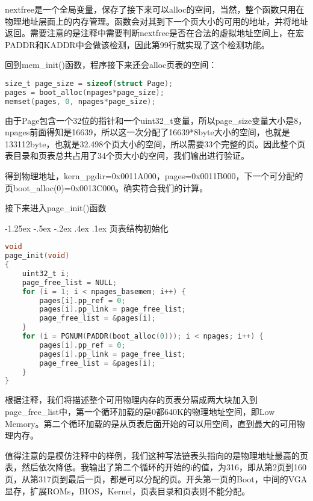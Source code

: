 \documentclass[11pt,a4paper]{article}
\makeatletter
\newcommand{\sihao}{\fontsize{14pt}{\baselineskip}\selectfont}
\renewcommand\subsection{\@startsection{subsection}{1}{\z@}%
{-1.25ex \@plus -.5ex \@minus -.2ex}%
{.4ex \@plus .1ex}%
{\normalfont\sihao\fontspec{黑体}}}
\makeatother
\begin{document}
nextfree是一个全局变量，保存了接下来可以alloc的空间，当然，整个函数只用在物理地址层面上的内存管理。函数会对其到下一个页大小的可用的地址，并将地址返回。需要注意的是注释中需要判断nextfree是否在合法的虚拟地址空间上，在宏PADDR和KADDR中会做该检测，因此第99行就实现了这个检测功能。

回到mem\_init()函数，程序接下来还会alloc页表的空间：
\setmainfont{Consolas}
\begin{lstlisting}[language={C},firstnumber=160,title=kern/pmap.c] 
size_t page_size = sizeof(struct Page);
pages = boot_alloc(npages*page_size);
memset(pages, 0, npages*page_size);
\end{lstlisting}
\setmainfont[BoldFont=黑体]{宋体}

由于Page包含一个32位的指针和一个uint32\_t变量，所以page\_size变量大小是8，npages前面得知是16639，所以这一次分配了16639*8byte大小的空间，也就是133112byte，也就是32.498个页大小的空间，所以需要33个完整的页。因此整个页表目录和页表总共占用了34个页大小的空间，我们输出进行验证。

得到物理地址，kern\_pgdir=0x0011A000，pages=0x0011B000，下一个可分配的页boot\_alloc(0)=0x0013C000。确实符合我们的计算。

接下来进入page\_init()函数

\subsection{页表结构初始化}

\setmainfont{Consolas}
\begin{lstlisting}[language={C},firstnumber=249,title=kern/pmap.c] 
void
page_init(void)
{
	uint32_t i;
	page_free_list = NULL;
	for (i = 1; i < npages_basemem; i++) {
		pages[i].pp_ref = 0;
		pages[i].pp_link = page_free_list;
		page_free_list = &pages[i];
	}
	for (i = PGNUM(PADDR(boot_alloc(0))); i < npages; i++) {
		pages[i].pp_ref = 0;
		pages[i].pp_link = page_free_list;
		page_free_list = &pages[i];
	}
}
\end{lstlisting}
\setmainfont[BoldFont=黑体]{宋体}

根据注释，我们将描述整个可用物理内存的页表分隔成两大块加入到page\_free\_list中，第一个循环加载的是0都640K的物理地址空间，即Low Memory。第二个循环加载的是从页表后面开始的可以用空间，直到最大的可用物理内存。

值得注意的是模仿注释中的样例，我们这种写法链表头指向的是物理地址最高的页表，然后依次降低。我输出了第二个循环的开始的i的值，为316，即从第2页到160页，从第317页到最后一页，都是可以分配的页。开头第一页的Boot，中间的VGA显存，扩展ROMs，BIOS，Kernel，页表目录和页表则不能分配。
\end{document}
